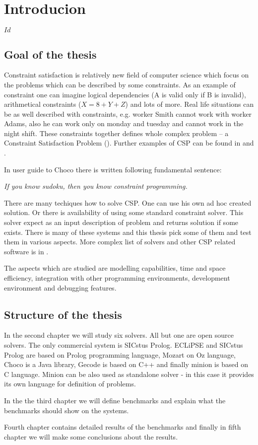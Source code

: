 \chapter{Introducion}

\begin{svn_verze}
$Id$
\end{svn_verze}

\section{Goal of the thesis}
Constraint satisfaction is relatively new field of computer science which focus on the problems
which can be described by some constraints. As an example of constraint one can imagine logical dependencies 
(A is valid only if B is invalid), arithmetical constraints ($X = 8 + Y + Z$) and lots of more. Real life situations can 
be as well described with constraints, e.g. worker Smith cannot work with worker Adams, also he can work only 
on monday and tuesday and cannot work in the night shift. These constraints together defines whole
complex problem -- a Constraint Satisfaction Problem ().
Further examples of CSP can be found in \cite{csplib} and \cite{Apt2003}.

In user guide to Choco there is written following fundamental sentence:

\begin{center}
\em If you know sudoku, then you know constraint programming.
\end{center}

There are many techiques how to solve CSP. One can use his own ad hoc created solution. 
Or there is availability of using some standard constraint solver. This solver expect
as an input description of problem and returns solution if some exists. There is many 
of these systems and this thesis pick some of them and test them in various aspects.
More complex list of solvers and other CSP related software is in \cite{bartak:los}.

The aspects which are studied are modelling capabilities, time and space efficiency, 
integration with other programming environments, development environment and debugging features. 

\section{Structure of the thesis}

In the second chapter we will study six solvers. All but one are open source solvers. 
The only commercial system is SICstus Prolog. ECLiPSE and SICstus Prolog are based on Prolog
programming language, Mozart on Oz language, Choco is a Java library, Gecode is based on C++ and finally 
minion is based on C language. Minion can be also used as standalone solver - in this 
case it provides its own language for definition of problems.

In the the third chapter we will define benchmarks and explain what the benchmarks
should show on the systems.

Fourth chapter contains detailed results of the benchmarks and finally in fifth chapter 
we will make some conclusions about the results.
